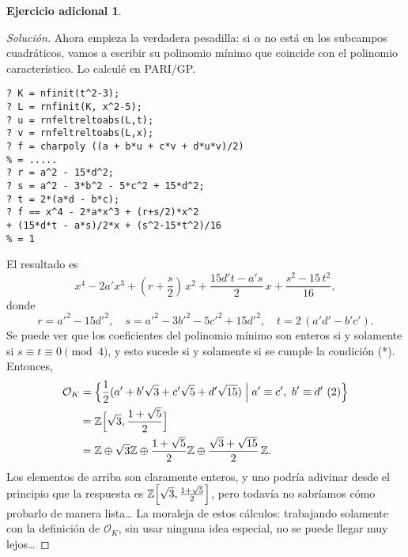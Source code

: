 \documentclass{article}
\theoremstyle{definition}
\newtheorem*{ejercicio-adicional}{Ejercicio adicional}
\newenvironment{solucion}{\begin{proof}[Solución]}{\end{proof}}
\newcommand{\ZZ}{\mathbb{Z}}
\renewcommand{\O}{\mathcal{O}}
\begin{document}
\begin{ejercicio-adicional}
\begin{solucion}
    Ahora empieza la verdadera pesadilla: si $\alpha$ no está en los subcampos
    cuadráticos, vamos a escribir su polinomio mínimo que coincide con el
    polinomio característico. Lo calculé en PARI/GP.

\begin{verbatim}
? K = nfinit(t^2-3);
? L = rnfinit(K, x^2-5);
? u = rnfeltreltoabs(L,t);
? v = rnfeltreltoabs(L,x);
? f = charpoly ((a + b*u + c*v + d*u*v)/2)
% = .....
? r = a^2 - 15*d^2;
? s = a^2 - 3*b^2 - 5*c^2 + 15*d^2;
? t = 2*(a*d - b*c);
? f == x^4 - 2*a*x^3 + (r+s/2)*x^2
+ (15*d*t - a*s)/2*x + (s^2-15*t^2)/16
% = 1
\end{verbatim}

    El resultado es
    \[ x^4  - 2a' x^3 + \left(r + \frac{s}{2}\right)\,x^2 +
       \frac{15 d' t - a' s}{2}\,x + \frac{s^2 - 15\,t^2}{16}, \]
    donde
    \[ r = a'^2 - 15 d'^2, \quad
       s = a'^2 - 3b'^2 - 5c'^2 + 15d'^2, \quad
       t = 2\,(a' d' - b' c'). \]
    Se puede ver que los coeficientes del polinomio mínimo son enteros si y
    solamente si $s \equiv t \equiv 0 \pmod{4}$, y esto sucede si y solamente si
    se cumple la condición (*). Entonces,
    \begin{align*}
      \O_K & = \Bigl\{ \frac{1}{2} (a' + b'\sqrt{3} + c'\sqrt{5} + d'\sqrt{15})
      \Bigm| a' \equiv c', ~ b' \equiv d' ~ (2) \Bigr\} \\
      & = \ZZ \Bigl[\sqrt{3}, \frac{1+\sqrt{5}}{2}\Bigr] \\
      & = \ZZ \oplus \sqrt{3}\ZZ \oplus \frac{1 + \sqrt{5}}{2}\ZZ
      \oplus \frac{\sqrt{3}+\sqrt{15}}{2}\,\ZZ.
    \end{align*}
    Los elementos de arriba son claramente enteros, y uno podría adivinar desde
    el principio que la respuesta es
    $\ZZ \Bigl[\sqrt{3}, \frac{1+\sqrt{5}}{2}\Bigr]$, pero todavía no sabríamos
    cómo probarlo de manera lista\dots{} La moraleja de estos cálculos:
    trabajando solamente con la definición de $\O_K$, sin usar ninguna idea
    especial, no se puede llegar muy lejos\dots
  \end{solucion}
  \fi
\end{ejercicio-adicional}
\end{document}

